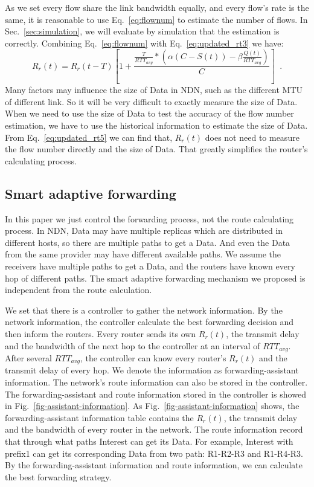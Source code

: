As we set every flow share the link bandwidth equally, and every flow's rate is the same, it is reasonable to use Eq.~\ref{eq:flownum} to estimate the number of flows. In Sec.~\ref{sec:simulation}, we will evaluate by simulation that the estimation is correctly.
Combining Eq.~\ref{eq:flownum} with Eq.~\ref{eq:updated_rt3} we have:
\begin{equation}
	\label{eq:updated_rt5}
	R_{r}(t)=R_{r}(t-T)[1+\frac{\frac{T}{RTT_{avg}}\ast(\alpha(C-S(t))-\beta\frac{Q(t)}{RTT_{avg}})}{C}] \enspace .
\end{equation}
Many factors may influence the size of Data in NDN, such as the different MTU of different link. So it will be very difficult to exactly measure the size of Data. When we need to use the size of Data to test the accuracy of the flow number estimation, we have to use the historical information to estimate the size of Data. From Eq.~\ref{eq:updated_rt5} we can find that, $R_{r}(t)$ does not need to measure the flow number directly and the size of Data. That greatly simplifies the router's calculating process.

\subsection{Smart adaptive forwarding}
In this paper we just control the forwarding process, not the route calculating process. In NDN, Data may have multiple replicas which are distributed in different hosts, so there are multiple paths to get a Data. And even the Data from the same provider may have different available paths. We assume the receivers have multiple paths to get a Data, and the routers have known every hop of different paths. The smart adaptive forwarding mechanism we proposed is independent from the route calculation.

We set that there is a controller to gather the network information. By the network information, the controller calculate the best forwarding decision and then inform the routers. Every router sends its own $R_{r}(t)$, the transmit delay and the bandwidth of the next hop to the controller at an interval of $RTT_{avg}$. After several $RTT_{avg}$, the controller can know every router's $R_{r}(t)$ and the transmit delay of every hop. We denote the information as forwarding-assistant information. The network's route information can also be stored in the controller. The forwarding-assistant and route information stored in the controller is showed in Fig.~\ref{fig-assistant-information}. As Fig.~\ref{fig-assistant-information} shows, the forwarding-assistant information table contains the $R_{r}(t)$, the transmit delay and the bandwidth of every router in the network. The route information record that through what paths Interest can get its Data. For example, Interest with prefix1 can get its corresponding Data from two path: R1-R2-R3 and R1-R4-R3. By the forwarding-assistant information and route information, we can calculate the best forwarding strategy.

